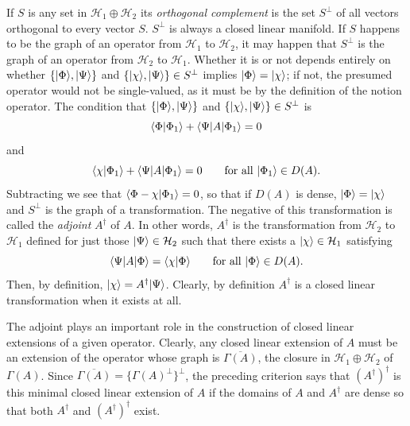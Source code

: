 If $S$ is any set in $\mathcal{H}_1\oplus\mathcal{H}_2$ its \emph{orthogonal
complement} is the set $S^\perp$ of all vectors orthogonal to every vector
$S$.  $S^\perp$ is always a closed linear manifold.  If $S$ happens to be the
graph of an operator from $\mathcal{H}_1$ to $\mathcal{H}_2$, it may happen
that $S^\perp$ is the graph of an operator from $\mathcal{H}_2$ to
$\mathcal{H}_1$.  Whether it is or not depends entirely on whether
$\{\lvert \Phi\rangle,\lvert \Psi\rangle\}$ and $\{\lvert \chi\rangle,\lvert \Psi\rangle\}\in S^\perp$
implies $\lvert \Phi\rangle=\lvert \chi\rangle$; if not, the presumed operator would not be
single-valued, as it must be by the definition of the notion operator.  The
condition that $\{\lvert \Phi\rangle,\lvert \Psi\rangle\}$ and
$\{\lvert \chi\rangle,\lvert \Psi\rangle\}\in S^\perp$ is
\begin{equation*}
  \langle \Phi\vert \Phi_1\rangle+\langle \Psi\vert A\vert \Phi_1\rangle=0
\end{equation*}
and
\begin{equation*}
  \langle \chi\vert \Phi_1\rangle+\langle \Psi\vert A\vert \Phi_1\rangle=0
  \qquad\text{for all }\lvert \Phi_1\rangle\in D(A).
\end{equation*}
Subtracting we see that $\langle \Phi-\chi\vert \Phi_1\rangle=0$, so that if
$D(A)$ is dense, $\lvert \Phi\rangle=\lvert \chi\rangle$ and $S^\perp$ is the graph of a
transformation.  The negative of this transformation is called the
\emph{adjoint} $A^\dagger$ of $A$.  In other words, $A^\dagger$ is the
transformation from $\mathcal{H}_2$ to $\mathcal{H}_1$ defined for just those
$\lvert \Psi\rangle\in\mathcal{H}_2$ such that there exists a $\lvert \chi\rangle\in
\mathcal{H}_1$ satisfying
\begin{equation*}
  \langle \Psi\vert A\vert \Phi\rangle=\langle \chi\vert \Phi\rangle
  \qquad\text{for all }\lvert \Phi\rangle\in D(A).
\end{equation*}
Then, by definition, $\lvert \chi\rangle=A^\dagger\lvert \Psi\rangle$.  Clearly, by
definition $A^\dagger$ is a closed linear transformation when it exists at
all.

The adjoint plays an important role in the construction of closed linear
extensions of a given operator.  Clearly, any closed linear extension of $A$
must be an extension of the operator whose graph is $\overline{\Gamma(A)}$,
the closure in $\mathcal{H}_1\oplus\mathcal{H}_2$ of $\Gamma(A)$.  Since
$\overline{\Gamma(A)}=\{\Gamma(A)^\perp\}^\perp$, the preceding criterion
says that $(A^\dagger)^\dagger$ is this minimal closed linear extension of
$A$ if the domains of $A$ and $A^\dagger$ are dense so that both
$A^\dagger$ and $(A^\dagger)^\dagger$ exist.

